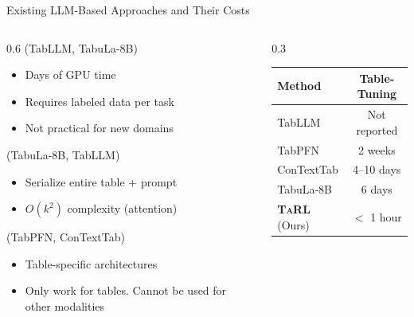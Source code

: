 \documentclass[
	10pt, %
	aspectratio=169, %
]{beamer}
\newcommand{\tarl}{\textbf{\textsc{TaRL}}}
\begin{document}
\begin{frame}{Existing LLM-Based Approaches and Their Costs}
	\vfill
	\begin{columns}[c]
		\begin{column}{0.6\textwidth}
			(TabLLM, TabuLa-8B)
			\begin{itemize}
				\item Days of GPU time
				\item Requires labeled data per task
				\item Not practical for new domains
			\end{itemize}
			\vspace{0.5em}
			(TabuLa-8B, TabLLM)
			\begin{itemize}
				\item Serialize entire table + prompt
				\item $O(k^2)$ complexity (attention)
			\end{itemize}
			\vspace{0.5em}
			(TabPFN, ConTextTab)
			\begin{itemize}
				\item Table-specific architectures
				\item Only work for tables. Cannot be used for other modalities
			\end{itemize}
		\end{column}
		\begin{column}{0.3\textwidth}
			\vspace{0.5em}
			\begin{center}
				\small
				\begin{tabular}{lc}
					\toprule
					\textbf{Method} & \textbf{Table-Tuning} \\
					\midrule
					TabLLM          & Not reported          \\
					TabPFN          & 2 weeks               \\
					ConTextTab      & 4--10 days            \\
					TabuLa-8B       & 6 days                \\
					\midrule
					\tarl{} (Ours)  & $<$ 1 hour            \\
					\bottomrule
				\end{tabular}
			\end{center}
		\end{column}
	\end{columns}
\end{frame}
\end{document}

